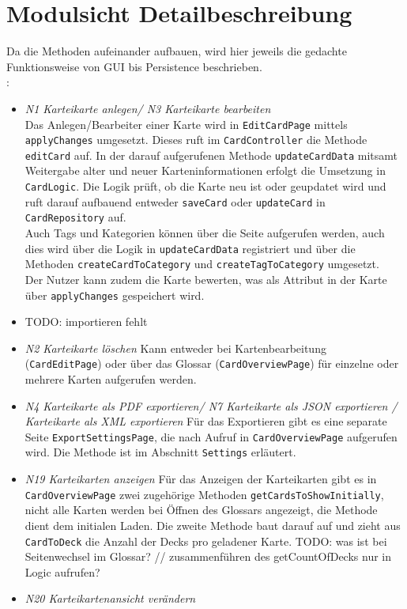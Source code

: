 \documentclass[fontsize=12pt,paper=A4,twoside]{scrartcl}
\begin{document}
    \section{Modulsicht Detailbeschreibung}
    Da die Methoden aufeinander aufbauen, wird hier jeweils die gedachte Funktionsweise von GUI bis Persistence beschrieben.\\
    :
    \begin{itemize}
    \item \textit{N1 Karteikarte anlegen/ N3 Karteikarte bearbeiten}\\ Das Anlegen/Bearbeiter einer Karte wird in \texttt{EditCardPage} mittels \texttt{applyChanges} umgesetzt.
    Dieses ruft im \texttt{CardController} die Methode \texttt{editCard} auf. In der darauf aufgerufenen Methode 
    \texttt{updateCardData} mitsamt Weitergabe alter und neuer Karteninformationen erfolgt die Umsetzung in \texttt{CardLogic}.
    Die Logik prüft, ob die Karte neu ist oder geupdatet wird und ruft darauf aufbauend entweder \texttt{saveCard} oder \texttt{updateCard}
    in \texttt{CardRepository} auf.\\
    Auch Tags und Kategorien können über die Seite aufgerufen werden, auch dies wird über die Logik in \texttt{updateCardData} registriert und über die Methoden 
    \texttt{createCardToCategory} und \texttt{createTagToCategory} umgesetzt.\\
    Der Nutzer kann zudem die Karte bewerten, was als Attribut in der Karte über \texttt{applyChanges} gespeichert wird.
    \item TODO: importieren fehlt
    \item \textit{N2 Karteikarte löschen} Kann entweder bei Kartenbearbeitung (\texttt{CardEditPage}) oder über das Glossar (\texttt{CardOverviewPage}) 
    für einzelne oder mehrere Karten aufgerufen werden.
    \item \textit{N4 Karteikarte als PDF exportieren/ N7 Karteikarte als JSON exportieren / Karteikarte als XML exportieren} Für das Exportieren gibt es eine separate Seite \texttt{ExportSettingsPage}, die nach Aufruf 
    in \texttt{CardOverviewPage} aufgerufen wird. Die Methode ist im Abschnitt \texttt{Settings} erläutert.
    \item \textit{N19 Karteikarten anzeigen} Für das Anzeigen der Karteikarten gibt es in \texttt{CardOverviewPage} zwei zugehörige Methoden
    \texttt{getCardsToShowInitially}, nicht alle Karten werden bei Öffnen
    des Glossars angezeigt, die Methode dient dem initialen Laden. Die zweite Methode baut darauf auf und zieht aus \texttt{CardToDeck} die Anzahl der
    Decks pro geladener Karte. TODO: was ist bei Seitenwechsel im Glossar? // zusammenführen des getCountOfDecks nur in Logic aufrufen?
    \item \textit{N20 Karteikartenansicht verändern}



    \end{itemize}
     \newpage
    \recalctypearea
\end{document}
